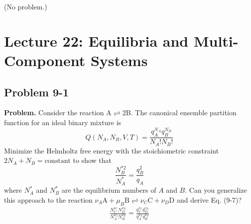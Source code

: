 \documentclass[twocolumn, 10pt]{article}
\numberwithin{equation}{section}
\newenvironment{problem}
{\par\medskip \color{problemblue}
  \textbf{Problem. }\ignorespaces}
{\medskip}
\begin{document}
(No problem.)

\section{Lecture 22: Equilibria and Multi-Component Systems}

\subsection{Problem 9-1}

\begin{problem}
  Consider the reaction
  $\mathrm{A} \rightleftharpoons 2\mathrm{B}$.
  The canonical ensemble partition function for an ideal binary mixture is
  $$
  Q(N_A, N_B, V, T)
  =
  \frac{ q_A^{N_A} q_B^{N_B} }
  { N_A! N_B! }
  $$
  Minimize the Helmholtz free energy with the stoichiometric constraint
  $2N_A + N_B = \mathrm{constant}$
  to show that
  \begin{equation}
    \frac{ N_B^{*2} } { N_A^* }
    =
    \frac{ q_B^2 } { q_A }
    \label{eq:NBNA}
  \end{equation}
  where $N_A^*$ and $N_B^*$ are the equilibrium numbers of $A$ and $B$.
  Can you generalize this approach to the reaction
  $\nu_A \mathrm{A} + \mu_B \mathrm{B} \rightleftharpoons \nu_C \mathrm{C} + \nu_D \mathrm{D}$
  and derive Eq. (9-7)?
  \begin{align}
    \frac{ N_C^{\nu_C} N_D^{\nu_D} }
         { N_A^{\nu_A} N_B^{\nu_B} }
    =
    \frac{ q_C^{\nu_C} q_D^{\nu_D} }
         { q_A^{\nu_A} q_B^{\nu_B} }
    \tag{9-7}
    \label{eq:chemeqABCD}
  \end{align}
\end{problem}
\end{document}
